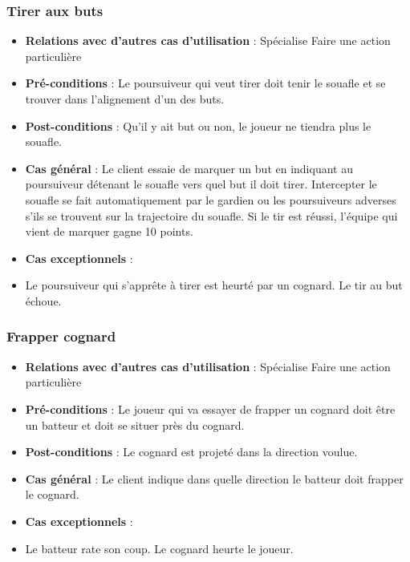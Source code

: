 \documentclass[a4paper,titlepage]{scrreprt}
\begin{document}
     \subsubsection{Tirer aux buts}
      \begin{itemize}
        \item \textbf{Relations avec d'autres cas d'utilisation}  : Spécialise Faire une action particulière
        \item \textbf{Pré-conditions} : Le poursuiveur qui veut tirer doit tenir le souafle et se trouver dans l’alignement d’un des buts. 
        \item \textbf{Post-conditions} : Qu’il y ait but ou non, le joueur ne tiendra plus le souafle.
        \item \textbf{Cas général} : Le client essaie de marquer un but en indiquant au poursuiveur détenant le souafle vers quel but il doit tirer. Intercepter le souafle se fait automatiquement par le \gls{gardien} ou les \gls{poursuiveur}s  adverses s’ils se trouvent sur la trajectoire du souafle. Si le tir est réussi, l'équipe qui vient de marquer gagne 10 points.
        \item \textbf{Cas exceptionnels} :
        \item Le poursuiveur qui s'apprête à tirer est heurté par un \gls{cognard}. Le tir au but échoue. 
      \end{itemize}
    \subsubsection{Frapper cognard}
      \begin{itemize}
        \item \textbf{Relations avec d'autres cas d'utilisation}  : Spécialise Faire une action particulière
        \item \textbf{Pré-conditions} : Le joueur qui va essayer de frapper un \gls{cognard} doit être un batteur et doit se situer près du cognard.
        \item \textbf{Post-conditions} : Le cognard est projeté dans la direction voulue.
        \item \textbf{Cas général} : Le client indique dans quelle direction le batteur doit frapper le cognard.
        \item \textbf{Cas exceptionnels} : 
        \item Le batteur rate son coup. Le cognard heurte le joueur.
      \end{itemize}
\end{document}
